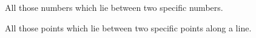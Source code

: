 All those numbers which lie between two specific 
numbers.
\par
All those points which lie between two specific points along a line.